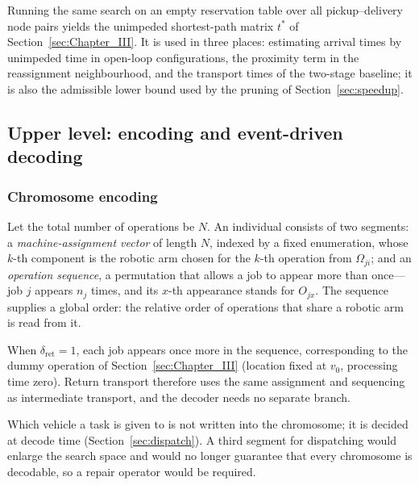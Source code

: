 Running the same search on an empty reservation table over all pickup--delivery node pairs yields the unimpeded shortest-path matrix $t^{*}$ of Section~\ref{sec:Chapter_III}.
It is used in three places: estimating arrival times by unimpeded time in open-loop configurations, the proximity term in the reassignment neighbourhood, and the transport times of the two-stage baseline; it is also the admissible lower bound used by the pruning of Section~\ref{sec:speedup}.


\subsection{Upper level: encoding and event-driven decoding}
\label{sec:upper}

\subsubsection{Chromosome encoding}
Let the total number of operations be $N$. An individual consists of two segments: a \emph{machine-assignment vector} of length $N$, indexed by a fixed enumeration, whose $k$-th component is the robotic arm chosen for the $k$-th operation from $\Omega_{ji}$;
and an \emph{operation sequence}, a permutation that allows a job to appear more than once---job $j$ appears $n_j$ times, and its $x$-th appearance stands for $O_{jx}$.
The sequence supplies a global order: the relative order of operations that share a robotic arm is read from it.

When $\delta_{\mathrm{ret}}=1$, each job appears once more in the sequence, corresponding to the dummy operation of Section~\ref{sec:Chapter_III} (location fixed at $v_0$, processing time zero).
Return transport therefore uses the same assignment and sequencing as intermediate transport, and the decoder needs no separate branch.

Which vehicle a task is given to is not written into the chromosome; it is decided at decode time (Section~\ref{sec:dispatch}).
A third segment for dispatching would enlarge the search space and would no longer guarantee that every chromosome is decodable, so a repair operator would be required.


